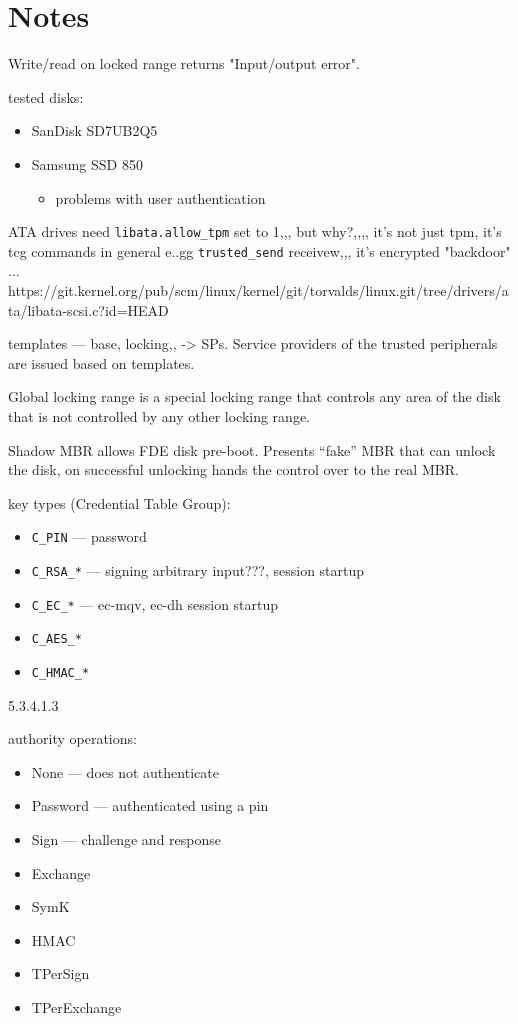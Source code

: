 
\chapter{Notes}

Write/read on locked range returns "Input/output error".

tested disks:
\begin{itemize}
    \item SanDisk SD7UB2Q5
    \item Samsung SSD 850
    \begin{itemize}
        \item problems with user authentication
    \end{itemize}
\end{itemize}

ATA drives need \verb|libata.allow_tpm| set to 1,,, but why?,,,, it's not just tpm, it's tcg commands in general e..gg \verb|trusted_send| receivew,,, it's encrypted "backdoor" ... https://git.kernel.org/pub/scm/linux/kernel/git/torvalds/linux.git/tree/drivers/ata/libata-scsi.c?id=HEAD

templates --- base, locking,, -> SPs. Service providers of the trusted peripherals are issued based on templates.

Global locking range is a special locking range that controls any area of the disk that is not controlled by any other locking range.

Shadow MBR allows FDE disk pre-boot. Presents ``fake'' MBR that can unlock the disk, on successful unlocking hands the control over to the real MBR.

key types (Credential Table Group): \begin{itemize}
    \item \verb|C_PIN| --- password
    \item \verb|C_RSA_*| --- signing arbitrary input???, session startup
    \item \verb|C_EC_*| --- ec-mqv, ec-dh session startup
    \item \verb|C_AES_*|
    \item \verb|C_HMAC_*|
\end{itemize}

5.3.4.1.3

authority operations: 
\begin{itemize}
    \item None --- does not authenticate
    \item Password --- authenticated using a pin
    \item Sign --- challenge and response
    \item Exchange
    \item SymK
    \item HMAC
    \item TPerSign
    \item TPerExchange
\end{itemize}

